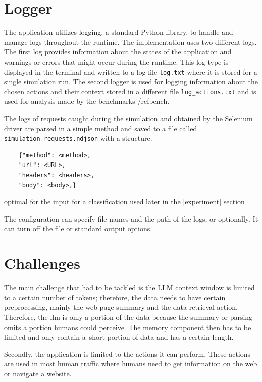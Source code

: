 \section{Logger}
\label{logging}

The application utilizes logging, a standard Python library, to handle and manage logs throughout the runtime. The implementation uses two different logs. The first log provides information about the states of the application and warnings or errors that might occur during the runtime. This log type is displayed in the terminal and written to a log file \verb|log.txt| where it is stored for a single simulation run. The second logger is used for logging information about the chosen actions and their context stored in a different file \verb|log_actions.txt| and is used for analysis made by the benchmarks /ref{bench}. 

The logs of requests caught during the simulation and obtained by the Selenium driver are parsed in a simple method and saved to a file called \\\verb|simulation_requests.ndjson| with a structure.

\begin{verbatim}
    {"method": <method>,
    "url": <URL>,
    "headers": <headers>,
    "body": <body>,}
\end{verbatim}

optimal for the input for a classification used later in the \ref{experiment} section

The configuration can specify file names and the path of the logs, or optionally. It can turn off the file or standard output options.

\section{Challenges}

The main challenge that had to be tackled is the LLM context window is limited to a certain number of tokens; therefore, the data needs to have certain preprocessing, mainly the web page summary and the data retrieval action. Therefore, the llm is only a portion of the data because the summary or parsing omits a portion humans could perceive. The memory component then has to be limited and only contain a~short portion of data and has a certain length.  

Secondly, the application is limited to the actions it can perform. These actions are used in most human traffic where humans need to get information on the web or navigate a website.

